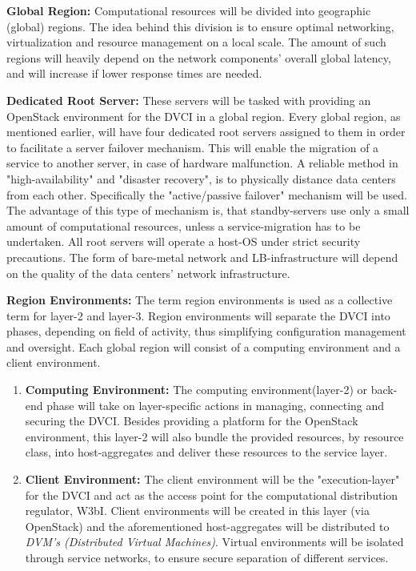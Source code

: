 \documentclass[]{article}
\begin{document}
\textbf{Global Region:} 
Computational resources will be divided into geographic (global) regions.
The idea behind this division is to ensure optimal networking, virtualization and resource management on a local scale.
The amount of such regions will heavily depend on the network components' overall global latency, and will increase if lower response times are needed.
\newline

\textbf{Dedicated Root Server:}
These servers will be tasked with providing an OpenStack environment for the DVCI in a global region.
Every global region, as mentioned earlier, will have four dedicated root servers assigned to them in order to facilitate a server failover mechanism. This will enable the migration of a service to another server, in case of hardware malfunction.
A reliable method in "high-availability" and "disaster recovery", is to physically distance data centers from each other. 
Specifically the "active/passive failover" mechanism will be used.
The advantage of this type of mechanism is, that standby-servers use only a small amount of computational resources, unless a service-migration has to be undertaken. 
All root servers will operate a host-OS under strict security precautions. 
The form of bare-metal network and LB-infrastructure will depend on the quality of the data centers' network infrastructure.
\newline

\textbf{Region Environments:}
The term region environments is used as a collective term for layer-2 and layer-3. 
Region environments will separate the DVCI into phases, depending on field of activity, thus simplifying configuration management and oversight.
Each global region will consist of a computing environment and a client environment. 

\begin{enumerate}[label=\textbullet]
	\item\textbf{Computing Environment:}
	The computing environment(layer-2) or back-end phase will take on layer-specific actions in managing, connecting and securing the DVCI. 
	Besides providing a platform for the OpenStack environment, this layer-2 will also bundle the provided resources, by resource class, into host-aggregates and deliver these resources to the service layer.  
	
	\item\textbf{Client Environment:} 
	The client environment will be the "execution-layer" for the DVCI and act as the access point for the computational distribution regulator, W3bI. 
	Client environments will be created in this layer (via OpenStack) and the aforementioned host-aggregates will be distributed to \textit{DVM's (Distributed Virtual Machines)}.
	Virtual environments will be isolated through service networks, to ensure secure separation of different services. 
\end{enumerate}
\end{document}
